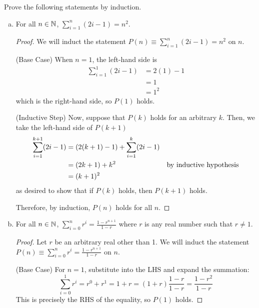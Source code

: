 \documentclass{agony}
\begin{document}
\question Prove the following statements by induction.
\begin{enumerate}[(a)]
  \item For all $n\in\mathbb{N}$, $\displaystyle \sum^n_{i=1} (2i-1) = n^2$.
        \begin{proof}
          We will induct the statement $P(n) \equiv \sum^n_{i=1} (2i-1) = n^2$ on $n$.

          (Base Case) When $n = 1$, the left-hand side is
          \begin{align*}
            \sum^1_{i=1} (2i-1) & = 2(1)-1 \\
                                & = 1      \\
                                & = 1^2
          \end{align*}
          which is the right-hand side, so $P(1)$ holds.

          (Inductive Step) Now, suppose that $P(k)$ holds for an arbitrary $k$.
          Then, we take the left-hand side of $P(k+1)$
          \begin{align*}
            \sum^{k+1}_{i=1} (2i-1)
             & = (2(k+1)-1) + \sum^k_{i=1} (2i-1) \\
             & = (2k+1) + k^2 & \text{by inductive hypothesis}                 \\
             & = (k+1)^2
          \end{align*}
          as desired to show that if $P(k)$ holds, then $P(k+1)$ holds.

          Therefore, by induction, $P(n)$ holds for all $n$.
        \end{proof}
  \item For all $n\in\mathbb{N}$, $\displaystyle \sum^n_{i=0} r^i = \frac{1-r^{n+1}}{1-r}$ where $r$ is any real number such that $r \neq 1$.
        \begin{proof}
          Let $r$ be an arbitrary real other than 1.
          We will induct the statement $P(n) \equiv \sum^n_{i=0} r^i = \frac{1-r^{n+1}}{1-r}$ on $n$.

          (Base Case) For $n=1$, substitute into the LHS and expand the summation:
          \begin{equation*}
            \sum^1_{i=0} r^i = r^0 + r^1 = 1 + r = (1+r)\frac{1-r}{1-r} = \frac{1-r^2}{1-r}
          \end{equation*}
          This is precisely the RHS of the equality, so $P(1)$ holds.


\end{proof}
\end{enumerate}
\end{document}
